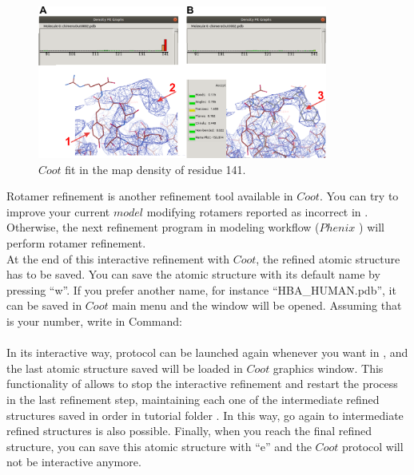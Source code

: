 \begin{itemize}
  \begin{figure}[H]
  \centering 
  \captionsetup{width=.7\linewidth} 
  \includegraphics[width=0.85\textwidth]{Images/Fig28}
  \caption{$Coot$ fit in the map density of residue  141.}
  \label{fig:coot_density_fit_analysis2}
  \end{figure}
  
 Rotamer refinement is another refinement tool available in $Coot$. You can try to improve your current $model$ modifying rotamers reported as incorrect in . Otherwise, the next refinement program in modeling workflow ($Phenix$ ) will perform rotamer refinement.\\
 
 At the end of this interactive refinement with $Coot$, the refined atomic structure has to be saved. You can save the atomic structure with its default name by pressing ``w''. If you prefer another name, for instance ``HBA\_HUMAN.pdb'', it can be saved in $Coot$ main menu  and the  window will be opened. Assuming that  is your  number, write in Command:\\
 \\
 
 In its interactive way,  protocol can be launched again whenever you want in \scipion, and the last atomic structure saved will be loaded in $Coot$ graphics window. This functionality of \scipion allows to stop the interactive refinement and restart the process in the last refinement step, maintaining each one of the intermediate refined structures saved in order in \scipion tutorial folder . In this way, go again to intermediate refined structures is also possible. Finally, when you reach the final refined structure, you can save this atomic structure with ``e'' and the $Coot$ protocol will not be interactive anymore.\\
 

\end{itemize}
